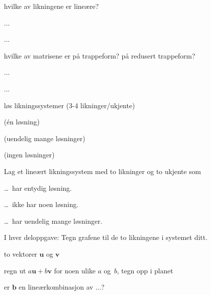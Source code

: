 \documentclass[11pt, a4paper, norsk]{NTNUoving}
\newcommand{\V}[1]{\mathbf{#1}}
\begin{document}
\begin{oppgave}
hvilke av likningene er lineære?
\begin{punkt}
...
\end{punkt}
\begin{punkt}
...
\end{punkt}
\end{oppgave}


\begin{oppgave}
hvilke av matrisene er på trappeform?  på redusert trappeform?
\begin{punkt}
...
\end{punkt}
\begin{punkt}
...
\end{punkt}
\end{oppgave}


\begin{oppgave}
løs likningssystemer (3-4 likninger/ukjente)
\begin{punkt}
(én løsning)
\end{punkt}
\begin{punkt}
(uendelig mange løsninger)
\end{punkt}
\begin{punkt}
(ingen løsninger)
\end{punkt}
\end{oppgave}


\begin{oppgave}
Lag et lineært likningssystem med to likninger og to ukjente som
\begin{punkt}
\ldots\ har entydig løsning.
\end{punkt}
\begin{punkt}
\ldots\ ikke har noen løsning.
\end{punkt}
\begin{punkt}
\ldots\ har uendelig mange løsninger.
\end{punkt}
I hver deloppgave: Tegn grafene til de to likningene i systemet ditt.
\end{oppgave}


\begin{oppgave}
to vektorer $\V{u}$ og $\V{v}$

regn ut $a \V{u} + b \V{v}$ for noen ulike $a$ og~$b$,
tegn opp i planet
\end{oppgave}


\begin{oppgave}
er $\V{b}$ en lineærkombinasjon av ...?
\end{oppgave}
\end{document}

